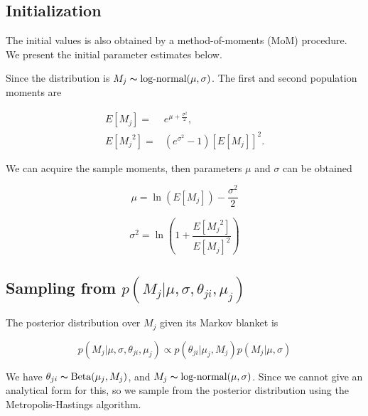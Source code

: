 \documentclass[11pt,reqno]{amsart}
\begin{document}
\subsection{Initialization}
The initial values is also obtained by a method-of-moments (MoM) procedure. We present the initial parameter estimates below.

Since the distribution is $ M_{j} \thicksim \text{log-normal}(\mu, \sigma)$. The first and second population moments are

\begin{eqnarray}
	E[M_{j}] = & e^{\mu+\frac{{\sigma}^2}{2}},\\
	E[{M_{j}}^2] = & \left(e^{{\sigma}^2}-1\right)[E[M_{j}]]^2.
\end{eqnarray}

We can acquire the sample moments, then parameters $\mu$ and $\sigma$ can be obtained

\begin{equation}
    \mu = \ln\left(E[M_{j}]\right)-\frac{{\sigma}^2}{2}
\end{equation}

\begin{equation}
    {\sigma}^2 = \ln\left(1+\frac{E[{M_{j}}^2]}{{E[M_{j}]}^2}\right)
\end{equation}


\subsection{Sampling from $p \left( M_{j} |\mu,\sigma, \theta_{ji},\mu_j\right)$}
The posterior distribution over $M_{j}$ given its Markov blanket is

\begin{equation}
	p( M_{j} |\mu, \sigma, \theta_{ji},\mu_j) \propto p(\theta_{ji} | \mu_j, M_j) p(M_{j} | \mu, \sigma)
\end{equation}

We have $ \theta_{ji}\thicksim\text{Beta}(\mu_{j},M_{j})$, and $ M_{j} \thicksim \text{log-normal}(\mu, \sigma)$. Since we cannot give an analytical form for this, so we sample from the posterior distribution using the Metropolis-Hastings algorithm.
\end{document}
